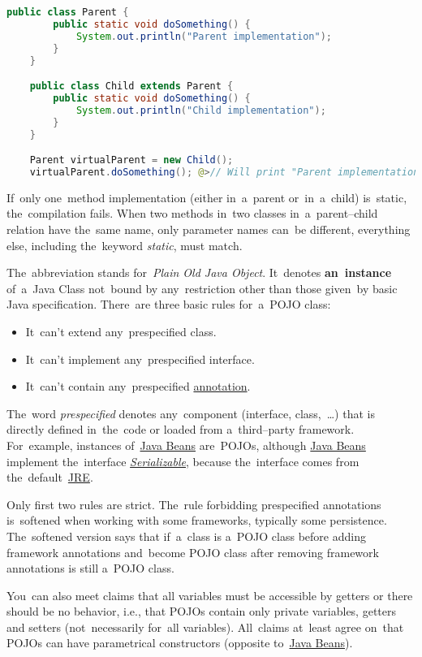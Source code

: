\example
\begin{lstlisting}[language=Java]
    public class Parent {
        public static void doSomething() {
            System.out.println("Parent implementation");
        }
    }

    public class Child extends Parent {
        public static void doSomething() {
            System.out.println("Child implementation");
        }
    }

    Parent virtualParent = new Child();
    virtualParent.doSomething(); @>// Will print "Parent implementation"
\end{lstlisting}

\note If~only one~method implementation (either in~a~parent or~in~a~child) is~static, the~compilation fails.
When two methods in~two classes in~a~parent--child relation have the~same name, only parameter names can~be different, everything else, including the~keyword \textit{static}, must match.

\label{pojo}
The~abbreviation stands for~\textit{Plain Old Java Object}.
It~denotes \textbf{an~instance} of~a~Java Class not~bound by any~restriction other than those given~by basic Java specification.
There~are three basic rules for~a~POJO class:
\begin{itemize}
    \item It~can't extend any~prespecified class.
    \item It~can't implement any~prespecified interface.
    \item It~can't contain any~prespecified \hyperref[javaannotation]{annotation}.
\end{itemize}
\noindent The~word \textit{prespecified} denotes any~component (interface, class,~\dots) that is directly defined in~the~code or loaded from a~third--party framework.
For~example, instances of~\hyperref[javabeans]{Java Beans} are~POJOs, although \hyperref[javabeans]{Java Beans} implement the~interface \hyperref[serialization]{\textit{Serializable}}, because the~interface comes from the~default~\hyperref[jdkjrejvm]{JRE}.

\warning Only first two rules are strict.
The~rule forbidding prespecified annotations is~softened when working with some frameworks, typically some persistence.
The~softened version says that if~a~class is a~POJO class before adding framework annotations and~become POJO class after removing framework annotations is still a~POJO class.

\warning You~can also meet claims that all variables must be accessible by getters or there should be no behavior, i.e., that POJOs contain only private variables, getters and setters (not~necessarily for~all variables).
All~claims at~least agree on~that POJOs can have parametrical constructors (opposite to~\hyperref[javabeans]{Java Beans}).

